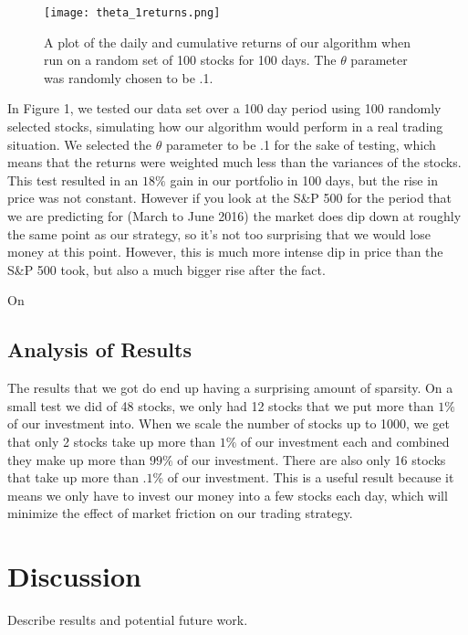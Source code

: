 \documentclass{article}
\begin{document}
\begin{figure}[H]
  \texttt{[image: theta\_1returns.png]}
  \caption{A plot of the daily and cumulative returns of our algorithm when run on a random set of 100 stocks for 100 days.  The $\theta$ parameter was randomly chosen to be .1.}
\end{figure}
In Figure 1, we tested our data set over a 100 day period using 100 randomly selected stocks, simulating how our algorithm would perform in a real trading situation.  We selected the $\theta$ parameter to be .1 for the sake of testing, which means that the returns were weighted much less than the variances of the stocks.  This test resulted in an $18\%$ gain in our portfolio in 100 days, but the rise in price was not constant.  However if you look at the S\&P 500 for the period that we are predicting for (March to June 2016) the market does dip down at roughly the same point as our strategy, so it's not too surprising that we would lose money at this point. However, this is much more intense dip in price than the S\&P 500 took, but also a much bigger rise after the fact.

On 

\subsection{Analysis of Results}

The results that we got do end up having a surprising amount of sparsity.  On a small test we did of 48 stocks, we only had 12 stocks that we put more than $1\%$ of our investment into.  When we scale the number of stocks up to 1000, we get that only 2 stocks take up more than $1\%$ of our investment each and combined they make up more than $99\%$ of our investment. There are also only 16 stocks that take up more than $.1\%$ of our investment.  This is a useful result because it means we only have to invest our money into a few stocks each day, which will minimize the effect of market friction on our trading strategy.










\section{Discussion}
\label{discuss}

Describe results and potential future work.
\end{document}

